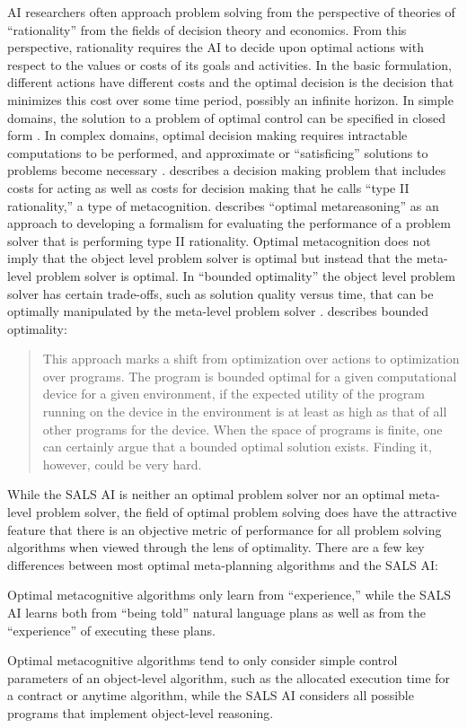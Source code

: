 AI researchers often approach problem solving from the perspective of
theories of ``rationality'' from the fields of decision theory and
economics.  From this perspective, rationality requires the AI to
decide upon optimal actions with respect to the values or costs of its
goals and activities.  In the basic formulation, different actions
have different costs and the optimal decision is the decision that
minimizes this cost over some time period, possibly an infinite
horizon.  In simple domains, the solution to a problem of optimal
control can be specified in closed form \cite[]{bertsekas:1995}.  In
complex domains, optimal decision making requires intractable
computations to be performed, and approximate or ``satisficing''
solutions to problems become necessary \cite[]{simon:1957,simon:1982}.
\cite{good:1971} describes a decision making problem that includes
costs for acting as well as costs for decision making that he calls
``type II rationality,'' a type of metacognition.
\cite{zilberstein:2008} describes ``optimal metareasoning'' as an
approach to developing a formalism for evaluating the performance of a
problem solver that is performing type II rationality.  Optimal
metacognition does not imply that the object level problem solver is
optimal but instead that the meta-level problem solver is optimal.  In
``bounded optimality'' the object level problem solver has certain
trade-offs, such as solution quality versus time, that can be
optimally manipulated by the meta-level problem solver
\cite[]{russell:1991}.  \cite{zilberstein:2008} describes bounded
optimality:
\begin{quote}
This approach marks a shift from optimization over actions to
optimization over programs.  The program is bounded optimal for a
given computational device for a given environment, if the expected
utility of the program running on the device in the environment is at
least as high as that of all other programs for the device.  When the
space of programs is finite, one can certainly argue that a bounded
optimal solution exists.  Finding it, however, could be very hard.
\end{quote}
While the SALS AI is neither an optimal problem solver nor an optimal
meta-level problem solver, the field of optimal problem solving does
have the attractive feature that there is an objective metric of
performance for all problem solving algorithms when viewed through the
lens of optimality.  There are a few key differences between most
optimal meta-planning algorithms and the SALS AI:
\begin{packed_enumerate}
\item{Optimal metacognitive algorithms only learn from ``experience,''
  while the SALS AI learns both from ``being told'' natural language
  plans as well as from the ``experience'' of executing these plans.}
\item{Optimal metacognitive algorithms tend to only consider simple
  control parameters of an object-level algorithm, such as the
  allocated execution time for a contract or anytime algorithm, while
  the SALS AI considers all possible programs that implement
  object-level reasoning.}
\end{packed_enumerate}
